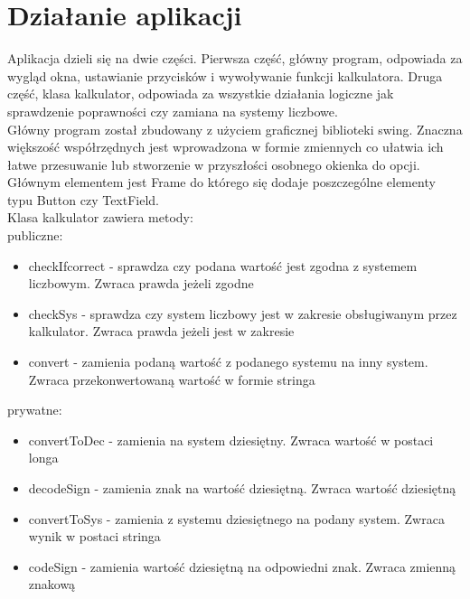 \documentclass[11pt,a4paper]{article}
\begin{document}
\section{Działanie aplikacji}
Aplikacja dzieli się na dwie części. Pierwsza część, główny program, odpowiada za wygląd okna, ustawianie przycisków i wywoływanie funkcji kalkulatora. Druga część, klasa kalkulator, odpowiada za wszystkie działania logiczne jak sprawdzenie poprawności czy zamiana na systemy liczbowe.\\
Główny program został zbudowany z użyciem graficznej biblioteki swing. Znaczna większość współrzędnych jest wprowadzona w formie zmiennych co ułatwia ich łatwe przesuwanie lub stworzenie w przyszłości osobnego okienka do opcji. Głównym elementem jest Frame do którego się dodaje poszczególne elementy typu Button czy TextField.\\
Klasa kalkulator zawiera metody:\\
publiczne:\\
\begin{itemize}
\item checkIfcorrect - sprawdza czy podana wartość jest zgodna z systemem liczbowym. Zwraca prawda jeżeli zgodne
\item checkSys - sprawdza czy system liczbowy jest w zakresie obsługiwanym przez kalkulator. Zwraca prawda jeżeli jest w zakresie
\item convert - zamienia podaną wartość z podanego systemu na inny system. Zwraca przekonwertowaną wartość w formie stringa
\end{itemize}
prywatne:\\
\begin{itemize}
\item convertToDec - zamienia na system dziesiętny. Zwraca wartość w postaci longa
\item decodeSign - zamienia znak na wartość dziesiętną. Zwraca wartość dziesiętną
\item convertToSys - zamienia z systemu dziesiętnego na podany system. Zwraca wynik w postaci stringa
\item codeSign - zamienia wartość dziesiętną na odpowiedni znak. Zwraca zmienną znakową
\end{itemize}
\end{document}
